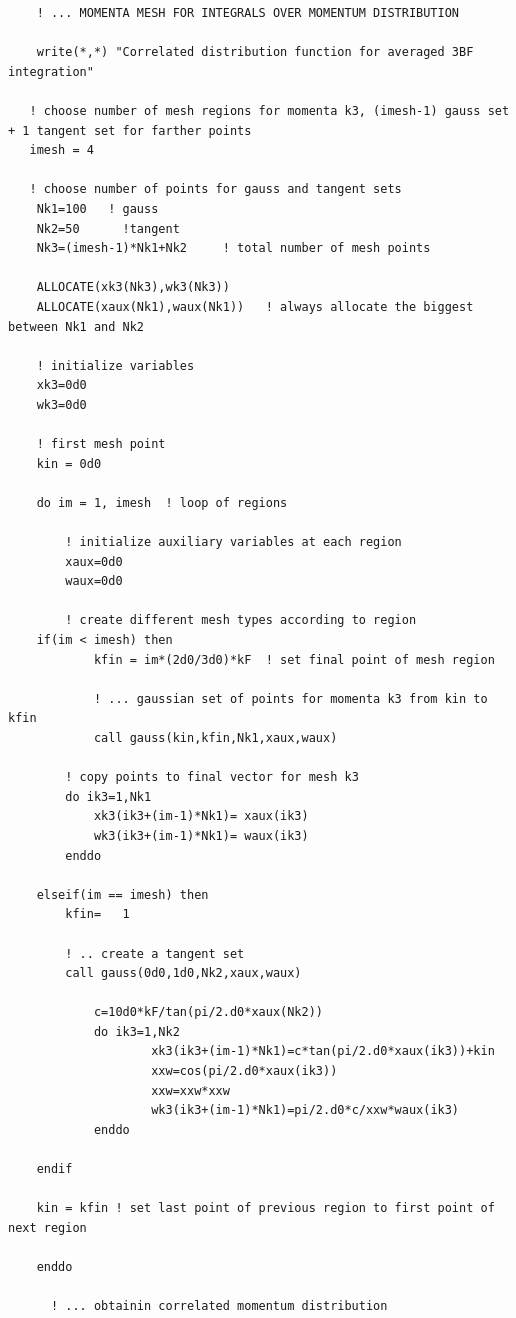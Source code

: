 \vspace*{0.3cm}
\lstset{alsolanguage=[90]Fortran}
\begin{lstlisting}
    ! ... MOMENTA MESH FOR INTEGRALS OVER MOMENTUM DISTRIBUTION 

    write(*,*) "Correlated distribution function for averaged 3BF integration"

   ! choose number of mesh regions for momenta k3, (imesh-1) gauss set + 1 tangent set for farther points
   imesh = 4 
   
   ! choose number of points for gauss and tangent sets
    Nk1=100   ! gauss
    Nk2=50      !tangent
    Nk3=(imesh-1)*Nk1+Nk2     ! total number of mesh points 
    
    ALLOCATE(xk3(Nk3),wk3(Nk3))
    ALLOCATE(xaux(Nk1),waux(Nk1))   ! always allocate the biggest between Nk1 and Nk2
    
    ! initialize variables
    xk3=0d0
    wk3=0d0
    
    ! first mesh point
    kin = 0d0
     
    do im = 1, imesh  ! loop of regions
    
    	! initialize auxiliary variables at each region
    	xaux=0d0 
    	waux=0d0
    
    	! create different mesh types according to region
   	if(im < imesh) then
    		kfin = im*(2d0/3d0)*kF  ! set final point of mesh region
        
    		! ... gaussian set of points for momenta k3 from kin to kfin
     		call gauss(kin,kfin,Nk1,xaux,waux)
		
		! copy points to final vector for mesh k3
		do ik3=1,Nk1
			xk3(ik3+(im-1)*Nk1)= xaux(ik3)
			wk3(ik3+(im-1)*Nk1)= waux(ik3)
		enddo

	elseif(im == imesh) then
		kfin=	1
	
		! .. create a tangent set
	 	call gauss(0d0,1d0,Nk2,xaux,waux)

     		c=10d0*kF/tan(pi/2.d0*xaux(Nk2))
     		do ik3=1,Nk2
        			xk3(ik3+(im-1)*Nk1)=c*tan(pi/2.d0*xaux(ik3))+kin
        			xxw=cos(pi/2.d0*xaux(ik3))
        			xxw=xxw*xxw
        			wk3(ik3+(im-1)*Nk1)=pi/2.d0*c/xxw*waux(ik3)
     		enddo
		
	endif
	
	kin = kfin ! set last point of previous region to first point of next region
	
	enddo

      ! ... obtainin correlated momentum distribution


\end{lstlisting}
